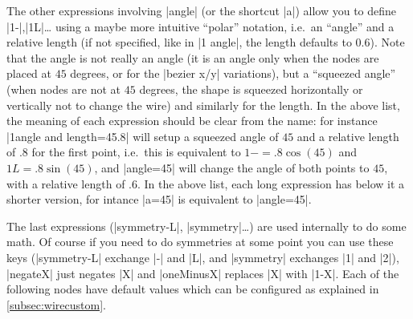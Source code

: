 \documentclass[a4paper]{ltxdoc}
\begin{document}
{\begin{pgfmanualentry}
  The other expressions involving |angle| (or the shortcut |a|) allow you to define |1-|,|1L|\dots{} using a maybe more intuitive ``polar'' notation, i.e.\ an ``angle'' and a relative length (if not specified, like in |1 angle|, the length defaults to $0.6$). Note that the angle is not really an angle (it is an angle only when the nodes are placed at $45$ degrees, or for the |bezier x/y| variations), but a ``squeezed angle'' (when nodes are not at $45$ degrees, the shape is squeezed horizontally or vertically not to change the wire) and similarly for the length. In the above list, the meaning of each expression should be clear from the name: for instance |1angle and length={45}{.8}| will setup a squeezed angle of $45$ and a relative length of $.8$ for the first point, i.e.\ this is equivalent to $1-=.8\cos(45)$ and $1L=.8\sin(45)$, and |angle=45| will change the angle of both points to $45$, with a relative length of $.6$. In the above list, each long expression has below it a shorter version, for intance |a=45| is equivalent to |angle=45|.

  The last expressions (|symmetry-L|, |symmetry|\dots) are used internally to do some math. Of course if you need to do symmetries at some point you can use these keys (|symmetry-L| exchange |-| and |L|, and |symmetry| exchanges |1| and |2|), |negateX| just negates |X| and |oneMinusX| replaces |X| with |1-X|. Each of the following nodes have default values which can be configured as explained in \cref{subsec:wirecustom}.
\end{pgfmanualentry}

}
\end{document}
